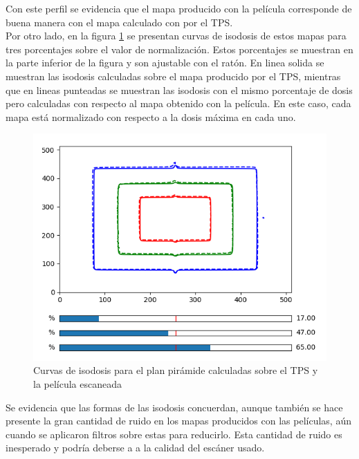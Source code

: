 Con este perfil se evidencia que el mapa producido con la película corresponde de buena manera con el mapa calculado con por el TPS.\\

Por otro lado, en la figura \ref{fig:isodosisPiramide}  se presentan curvas de isodosis de estos mapas para tres porcentajes sobre el valor de normalización. Estos porcentajes se muestran en la parte inferior de la figura y son ajustable con el ratón. En linea solida se muestran las isodosis calculadas sobre el mapa producido por el TPS, mientras que en lineas punteadas se muestran las isodosis con el mismo porcentaje de dosis pero calculadas con respecto al mapa obtenido con la película. En este caso, cada mapa está normalizado con respecto a la dosis máxima en cada uno. \\ 
\begin{figure}[H]
	\centering
	\includegraphics[width=0.7\linewidth]{images/isodosisPiramide2.png}
	\caption{Curvas de isodosis para el plan pirámide calculadas sobre el TPS y la película escaneada  }
	\label{fig:isodosisPiramide}
\end{figure}

Se evidencia que las formas de las isodosis concuerdan, aunque también se hace presente la gran cantidad de ruido en los mapas producidos con las películas, aún cuando se aplicaron filtros sobre estas para reducirlo. Esta cantidad de ruido es inesperado y podría deberse a a la calidad del escáner usado. \\

